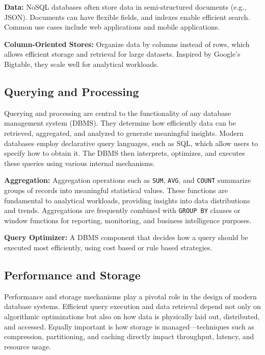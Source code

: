 \textbf{Data:} NoSQL databases often store data in semi-structured documents
(e.g., JSON). Documents can have flexible fields, and indexes enable efficient
search. Common use cases include web applications and mobile
applications\cite{Gessert2017}.

\textbf{Column-Oriented Stores:} Organize data by columns instead of rows,
which allows efficient storage and retrieval for large datasets. Inspired by
Google’s Bigtable, they scale well for analytical
workloads\cite{Chang2006Bigtable}.


\subsection{Querying and Processing}

Querying and processing are central to the functionality of any database
management system (DBMS). They determine how efficiently data can be retrieved,
aggregated, and analyzed to generate meaningful insights. Modern databases
employ declarative query languages, such as SQL, which allow users to specify
how to obtain it. The DBMS then interprets, optimizes, and executes these
queries using various internal mechanisms\cite{Silberschatz2020}.

\textbf{Aggregation:} Aggregation operations such as \texttt{SUM},
\texttt{AVG}, and \texttt{COUNT} summarize groups of records into meaningful
statistical values. These functions are fundamental to analytical workloads,
providing insights into data distributions and trends. Aggregations are
frequently combined with \texttt{GROUP BY} clauses or window functions for
reporting, monitoring, and business intelligence purposes.

\textbf{Query Optimizer:} A DBMS component that decides how a query should be
executed most efficiently, using cost based or rule based
strategies\cite{Selinger1979}.

\subsection{Performance and Storage}

Performance and storage mechanisms play a pivotal role in the design of modern
database systems. Efficient query execution and data retrieval depend not only
on algorithmic optimizations but also on how data is physically laid out,
distributed, and accessed. Equally important is how storage is
managed—techniques such as compression, partitioning, and caching directly
impact throughput, latency, and resource usage\cite{Silberschatz2020}.

